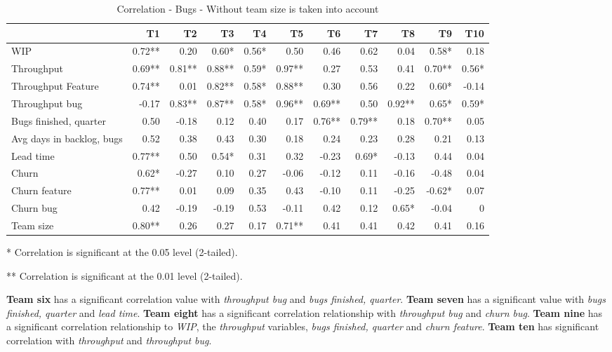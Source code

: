 \documentclass[UKenglish]{ifimaster}  %
\begin{document}
\begin{table}[h]
 \begin{adjustwidth}{-2.5cm}{}
 \centering
 \begin{tabular}{|l|r|r|r|r|r|r|r|r|r|r|}
\hline
 &  \bf{T1} & \bf{T2} & \bf{T3} & \bf{T4} & \bf{T5} & \bf{T6} & \bf{T7} & \bf{T8} & \bf{T9} & \bf{T10}\\ \hline
 WIP  & 0.72** & 0.20 & 0.60* & 0.56* & 0.50 & 0.46 & 0.62 & 0.04 & 0.58* & 0.18 \\ \hline
 Throughput  & 0.69** & 0.81** & 0.88** & 0.59* & 0.97** & 0.27 & 0.53 & 0.41 & 0.70** & 0.56* \\ \hline
 Throughput Feature  & 0.74** & 0.01 & 0.82** & 0.58* & 0.88** & 0.30 & 0.56 & 0.22 & 0.60* & -0.14 \\ \hline
 Throughput bug  & -0.17 & 0.83** & 0.87** & 0.58* & 0.96** & 0.69** & 0.50 & 0.92** & 0.65* & 0.59* \\ \hline
 Bugs finished, quarter  & 0.50 & -0.18 & 0.12 & 0.40 & 0.17 & 0.76** & 0.79** & 0.18 & 0.70** & 0.05 \\ \hline
 Avg days in backlog, bugs  & 0.52 & 0.38 & 0.43 & 0.30 & 0.18 & 0.24 & 0.23 & 0.28 & 0.21 & 0.13 \\ \hline
 Lead time  & 0.77** & 0.50 & 0.54* & 0.31 & 0.32 & -0.23 & 0.69* & -0.13 & 0.44 & 0.04 \\ \hline
 Churn  & 0.62* & -0.27 & 0.10 & 0.27 & -0.06 & -0.12 & 0.11 & -0.16 & -0.48 & 0.04 \\ \hline
 Churn feature  & 0.77** & 0.01 & 0.09 & 0.35 & 0.43 & -0.10 & 0.11 & -0.25 & -0.62* & 0.07 \\ \hline
 Churn bug  & 0.42 & -0.19 & -0.19 & 0.53 & -0.11 & 0.42 & 0.12 & 0.65* & -0.04 & 0\\ \hline
 Team size  & 0.80** & 0.26 & 0.27 & 0.17 & 0.71** & 0.41 & 0.41 & 0.42 & 0.41 & 0.16 \\ \hline
\end{tabular}
 \caption{Correlation - Bugs - Without team size is taken into account}
 \label{corr:bug}
 \centerline {* Correlation is significant at the 0.05 level (2-tailed).}
\centerline{** Correlation is significant at the 0.01 level (2-tailed).}
\end{adjustwidth}
\end{table}
\newpage
\textbf{Team six} has a significant correlation value with \textit{throughput bug} and \textit{bugs finished, quarter}. \textbf{Team seven} has a significant value with \textit{bugs finished, quarter} and \textit{lead time}. \textbf{Team eight} has a significant correlation relationship with \textit{throughput bug} and \textit{churn bug}. \textbf{Team nine} has a significant correlation relationship to \textit{WIP}, the \textit{throughput} variables, \textit{bugs finished, quarter} and \textit{churn feature}. \textbf{Team ten} has significant correlation with \textit{throughput} and \textit{throughput bug}.
\end{document}
